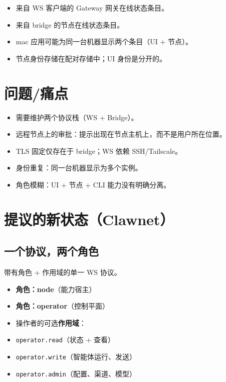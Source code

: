 \begin{itemize}
  \item 来自 WS 客户端的 Gateway 网关在线状态条目。
  \item 来自 bridge 的节点在线状态条目。
  \item mac 应用可能为同一台机器显示两个条目（UI + 节点）。
  \item 节点身份存储在配对存储中；UI 身份是分开的。
\end{itemize}


\hrulefill


\section{问题/痛点}


\begin{itemize}
  \item 需要维护两个协议栈（WS + Bridge）。
  \item 远程节点上的审批：提示出现在节点主机上，而不是用户所在位置。
  \item TLS 固定仅存在于 bridge；WS 依赖 SSH/Tailscale。
  \item 身份重复：同一台机器显示为多个实例。
  \item 角色模糊：UI + 节点 + CLI 能力没有明确分离。
\end{itemize}


\hrulefill


\section{提议的新状态（Clawnet）}


\subsection{一个协议，两个角色}


带有角色 + 作用域的单一 WS 协议。

\begin{itemize}
  \item \textbf{角色：node}（能力宿主）
  \item \textbf{角色：operator}（控制平面）
  \item 操作者的可选\textbf{作用域}：
  \item \texttt{operator.read}（状态 + 查看）
  \item \texttt{operator.write}（智能体运行、发送）
  \item \texttt{operator.admin}（配置、渠道、模型）
\end{itemize}


